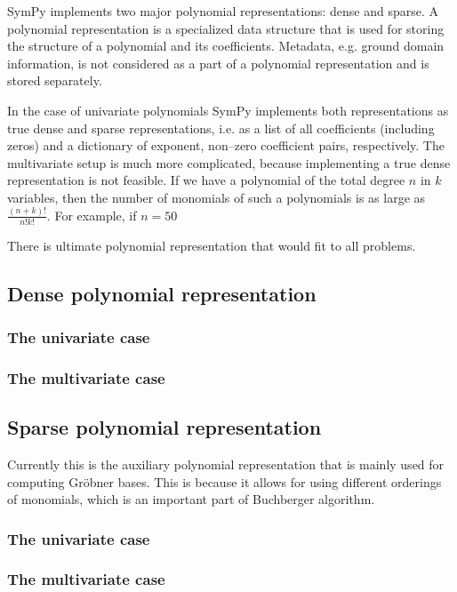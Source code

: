 SymPy implements two major polynomial representations: dense and sparse. A polynomial
representation is a specialized data structure that is used for storing the structure
of a polynomial and its coefficients. Metadata, e.g. ground domain information, is not
considered as a part of a polynomial representation and is stored separately.

In the case of univariate polynomials SymPy implements both representations as true dense
and sparse representations, i.e. as a list of all coefficients (including zeros) and a
dictionary of exponent, non--zero coefficient pairs, respectively. The multivariate setup
is much more complicated, because implementing a true dense representation is not feasible.
If we have a polynomial of the total degree $n$ in $k$ variables, then the number of monomials
of such a polynomials is as large as $\frac{(n + k)!}{n! k!}$. For example, if $n = 50$

There is ultimate polynomial representation that would fit to all problems.


\subsection{Dense polynomial representation}


\subsubsection{The univariate case}


\subsubsection{The multivariate case}


\subsection{Sparse polynomial representation}

Currently this is the auxiliary polynomial representation that is mainly used for computing
Gröbner bases. This is because it allows for using different orderings of monomials, which
is an important part of Buchberger algorithm.


\subsubsection{The univariate case}


\subsubsection{The multivariate case}


